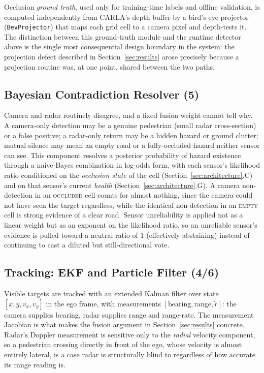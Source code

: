 \documentclass[conference]{IEEEtran}
\begin{document}
Occlusion \emph{ground truth}, used only for training-time labels and
offline validation, is computed independently from CARLA's depth buffer
by a bird's-eye projector (\texttt{BevProjector}) that maps each grid
cell to a camera pixel and depth-tests it. The distinction between this
ground-truth module and the runtime detector above is the single most
consequential design boundary in the system: the projection defect
described in Section~\ref{sec:results} arose precisely because a
projection routine was, at one point, shared between the two paths.

\subsection{Bayesian Contradiction Resolver (5)}

Camera and radar routinely disagree, and a fixed fusion weight cannot
tell why. A camera-only detection may be a genuine pedestrian (small
radar cross-section) or a false positive; a radar-only return may be a
hidden hazard or ground clutter; mutual silence may mean an empty road
or a fully-occluded hazard neither sensor can see. This component
resolves a posterior probability of hazard existence through a
naive-Bayes combination in log-odds form, with each sensor's likelihood
ratio conditioned on the \emph{occlusion state} of the cell
(Section~\ref{sec:architecture}.C) and on that sensor's current
\emph{health} (Section~\ref{sec:architecture}.G). A camera
non-detection in an \textsc{occluded} cell counts for almost nothing,
since the camera could not have seen the target regardless, while the
identical non-detection in an \textsc{empty} cell is strong evidence of
a clear road. Sensor unreliability is applied not as a linear weight
but as an exponent on the likelihood ratio, so an unreliable sensor's
evidence is pulled toward a neutral ratio of 1 (effectively abstaining)
instead of continuing to cast a diluted but still-directional vote.

\subsection{Tracking: EKF and Particle Filter (4/6)}

Visible targets are tracked with an extended Kalman filter over state
$[x, y, v_x, v_y]$ in the ego frame, with measurements
$[\text{bearing}, \text{range}, \dot{r}]$: the camera supplies bearing,
radar supplies range and range-rate. The measurement Jacobian is what
makes the fusion argument in Section~\ref{sec:results} concrete.
Radar's Doppler measurement is sensitive only to the \emph{radial}
velocity component, so a pedestrian crossing directly in front of the
ego, whose velocity is almost entirely lateral, is a case radar is
structurally blind to regardless of how accurate its range reading is.
\end{document}
